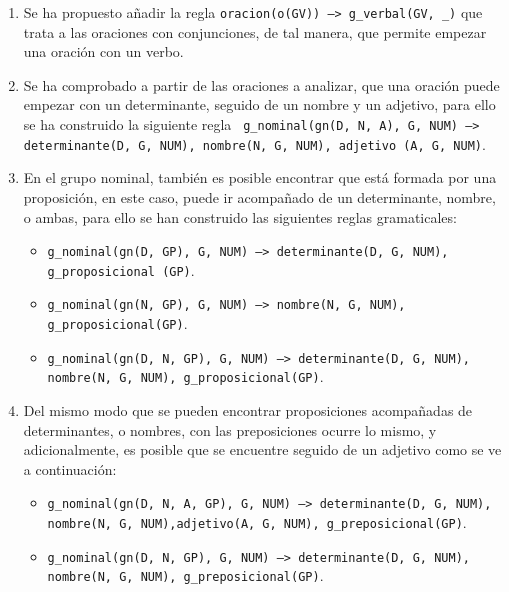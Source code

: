 \documentclass[a4paper]{article}
\begin{document}
    \begin{enumerate}

        \item Se ha propuesto añadir la regla  \texttt{oracion(o(GV)) --> g\_verbal(GV, \_)} que trata a las oraciones con conjunciones, de tal manera, que permite empezar una oración con un verbo.

        \item Se ha comprobado a partir de las oraciones a analizar, que una oración puede empezar con un determinante, seguido de un nombre y un adjetivo, para ello se ha construido la siguiente regla \texttt{ g\_nominal(gn(D, N, A), G, NUM) --> determinante(D, G, NUM), nombre(N, G, NUM), adjetivo (A, G, NUM)}.

        \item En el grupo nominal, también es posible encontrar que está formada por una proposición, en este caso, puede ir acompañado de un determinante, nombre, o ambas, para ello se han construido las siguientes reglas gramaticales:

            \begin{itemize}

                \item \texttt{g\_nominal(gn(D, GP), G, NUM) --> determinante(D, G, NUM), g\_proposicional (GP)}.

                \item \texttt{g\_nominal(gn(N, GP), G, NUM) --> nombre(N, G, NUM), g\_proposicional(GP)}.

                \item \texttt{g\_nominal(gn(D, N, GP), G, NUM) --> determinante(D, G, NUM), nombre(N, G, NUM), g\_proposicional(GP)}.

            \end{itemize}

        \item Del mismo modo que se pueden encontrar proposiciones acompañadas de determinantes, o nombres, con las preposiciones ocurre lo mismo, y adicionalmente, es posible  que se encuentre seguido de un adjetivo como se ve a continuación:

            \begin{itemize}

                \item \texttt{g\_nominal(gn(D, N, A, GP), G, NUM) --> determinante(D, G, NUM), nombre(N, G, NUM),adjetivo(A, G, NUM), g\_preposicional(GP)}.

                \item \texttt{g\_nominal(gn(D, N, GP), G, NUM) --> determinante(D, G, NUM), nombre(N, G, NUM), g\_preposicional(GP)}.


\end{itemize}
\end{enumerate}
\end{document}

